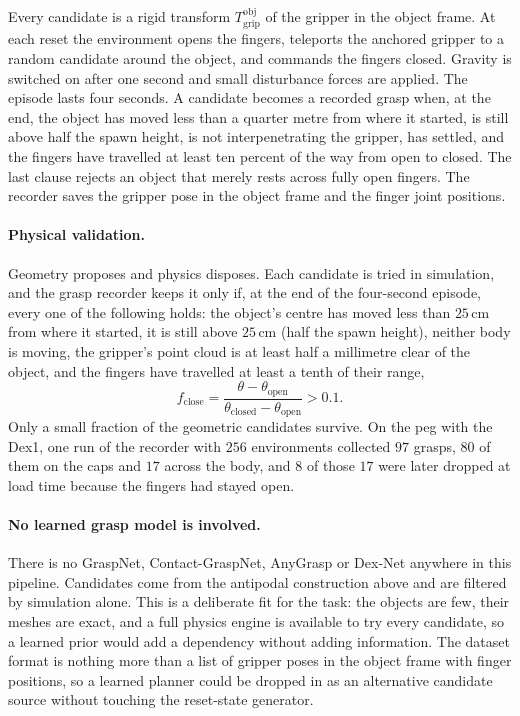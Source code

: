 \documentclass{article}
\newcommand{\Tf}[2]{T^{#1}_{#2}}
\newcommand{\obj}{\mathrm{obj}}
\newcommand{\grip}{\mathrm{grip}}
\begin{document}
Every candidate is a rigid transform $\Tf{\obj}{\grip}$ of the gripper in the object frame. At each reset the environment opens the fingers, teleports the anchored gripper to a random candidate around the object, and commands the fingers closed. Gravity is switched on after one second and small disturbance forces are applied. The episode lasts four seconds. A candidate becomes a recorded grasp when, at the end, the object has moved less than a quarter metre from where it started, is still above half the spawn height, is not interpenetrating the gripper, has settled, and the fingers have travelled at least ten percent of the way from open to closed. The last clause rejects an object that merely rests across fully open fingers. The recorder saves the gripper pose in the object frame and the finger joint positions.

\paragraph{Physical validation.}
Geometry proposes and physics disposes. Each candidate is tried in simulation, and the grasp recorder keeps it only if, at the end of the four-second episode, every one of the following holds: the object's centre has moved less than $25$\,cm from where it started, it is still above $25$\,cm (half the spawn height), neither body is moving, the gripper's point cloud is at least half a millimetre clear of the object, and the fingers have travelled at least a tenth of their range,
\begin{equation}
  f_{\mathrm{close}} = \frac{\theta-\theta_{\mathrm{open}}}{\theta_{\mathrm{closed}}-\theta_{\mathrm{open}}} > 0.1 .
\end{equation}
Only a small fraction of the geometric candidates survive. On the peg with the Dex1, one run of the recorder with $256$ environments collected $97$ grasps, $80$ of them on the caps and $17$ across the body, and $8$ of those $17$ were later dropped at load time because the fingers had stayed open.

\paragraph{No learned grasp model is involved.}
There is no GraspNet, Contact-GraspNet, AnyGrasp or Dex-Net anywhere in this pipeline. Candidates come from the antipodal construction above and are filtered by simulation alone. This is a deliberate fit for the task: the objects are few, their meshes are exact, and a full physics engine is available to try every candidate, so a learned prior would add a dependency without adding information. The dataset format is nothing more than a list of gripper poses in the object frame with finger positions, so a learned planner could be dropped in as an alternative candidate source without touching the reset-state generator.
\end{document}
